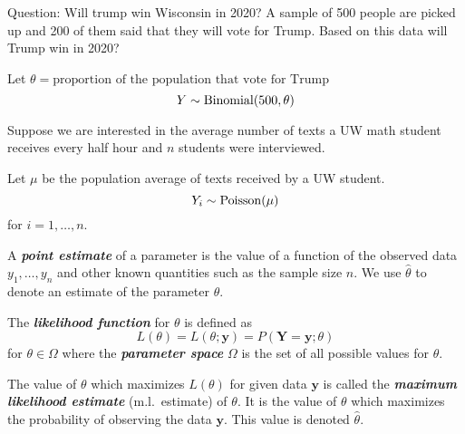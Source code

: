 \begin{exbox}
    \begin{example}
        Question: Will trump win Wisconsin in 2020? A sample of 500 people
        are picked up and 200 of them said that they will vote for Trump. Based
        on this data will Trump win in 2020?

        Let $ \theta=\text{proportion of the population that vote for Trump} $
        \[ Y \sim \operatorname{Binomial}(500,\theta) \]
    \end{example}
\end{exbox}

\begin{exbox}
    \begin{example}
        Suppose we are interested in the average number of texts a UW math student
        receives every half hour and $ n $ students were interviewed.

        Let $ \mu $ be the population average of texts received by a UW student.
        \[ Y_i \sim \operatorname{Poisson}(\mu) \]
        for $ i=1,\ldots ,n $.
    \end{example}
\end{exbox}

\begin{defbox}
    \begin{definition}
        A \textbf{\emph{point estimate}} of a parameter is the value of a function
        of the observed data $ y_1,\ldots ,y_n $ and other known quantities such as
        the sample size $ n $. We use $ \hat{\theta} $ to denote an estimate
        of the parameter $ \theta $.
    \end{definition}
\end{defbox}

\begin{defbox}
    \begin{definition}
        The \textbf{\emph{likelihood function}} for $ \theta $ is defined as
        \[ L(\theta)=L(\theta;\bm{y})=P(\bm{Y}=\bm{y}; \theta) \]
        for $ \theta\in\Omega $ where the \textbf{\emph{parameter space}} $ \Omega $
        is the set of all possible values for $ \theta $.
    \end{definition}
\end{defbox}

\begin{defbox}
    \begin{definition}
        The value of $ \theta $ which maximizes $ L(\theta) $ for given data $ \bm{y} $
        is called the \textbf{\emph{maximum likelihood estimate}} (m.l.\ estimate) of $ \theta $.
        It is the value of $ \theta $ which maximizes the probability of observing the data
        $ \bm{y} $. This value is denoted $ \hat{\theta} $.
    \end{definition}
\end{defbox}

